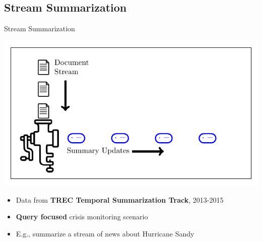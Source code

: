 \subsection{Stream Summarization}
\begin{frame}{Stream Summarization}


 \begin{center}
   \includegraphics[scale=.8]{2_feature_based_models_of_salience/image_texs/stream_sum/stream_sum.pdf}
 \end{center}

 \begin{itemize}
     \item Data from \textbf{TREC Temporal Summarization Track}, 2013-2015
     \item \textbf{Query focused} crisis monitoring scenario 
  \item E.g., summarize a stream of news about Hurricane Sandy
 \end{itemize}
\end{frame}




